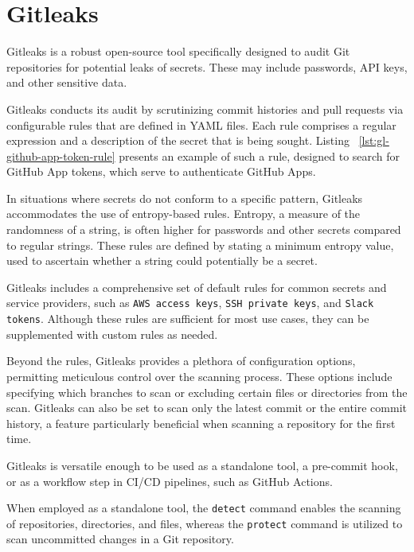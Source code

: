 \section{Gitleaks}\label{sec:gitleaks}

Gitleaks is a robust open-source tool specifically designed to audit Git repositories for potential leaks of secrets.
These may include passwords, API keys, and other sensitive data.

Gitleaks conducts its audit by scrutinizing commit histories and pull requests via configurable rules that are defined in YAML files.
Each rule comprises a regular expression and a description of the secret that is being sought.
Listing ~\ref{lst:gl-github-app-token-rule} presents an example of such a rule, designed to search for GitHub App tokens, which serve to authenticate GitHub Apps.

In situations where secrets do not conform to a specific pattern, Gitleaks accommodates the use of entropy-based rules.
Entropy, a measure of the randomness of a string, is often higher for passwords and other secrets compared to regular strings.
These rules are defined by stating a minimum entropy value, used to ascertain whether a string could potentially be a secret.



Gitleaks includes a comprehensive set of default rules for common secrets and service providers, such as \texttt{AWS access keys}, \texttt{SSH private keys}, and \texttt{Slack tokens}.
Although these rules are sufficient for most use cases, they can be supplemented with custom rules as needed.

Beyond the rules, Gitleaks provides a plethora of configuration options, permitting meticulous control over the scanning process.
These options include specifying which branches to scan or excluding certain files or directories from the scan.
Gitleaks can also be set to scan only the latest commit or the entire commit history, a feature particularly beneficial when scanning a repository for the first time.

Gitleaks is versatile enough to be used as a standalone tool, a pre-commit hook, or as a workflow step in CI/CD pipelines, such as GitHub Actions.

When employed as a standalone tool, the \texttt{detect} command enables the scanning of repositories, directories, and files, whereas the \texttt{protect} command is utilized to scan uncommitted changes in a Git repository.

